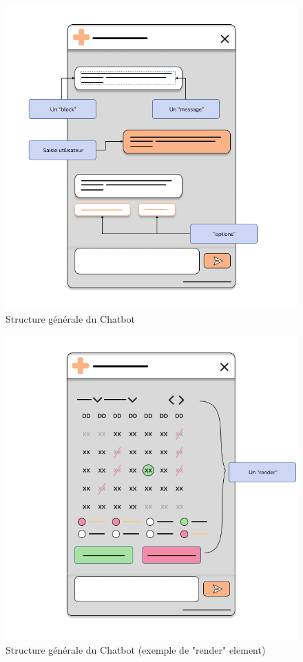 \begin{figure}[H] 
    \centering
    \includegraphics[scale=0.5]{Figures/cbs_general.png}
    \caption{Structure générale du Chatbot}
\end{figure}


\begin{figure}[H] 
    \centering
    \includegraphics[scale=0.5]{Figures/cbs_render.png}
    \caption{Structure générale du Chatbot (exemple de "render" element)}
\end{figure}

